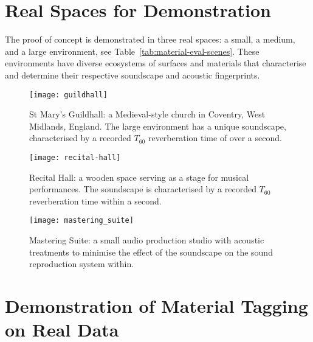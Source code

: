 \section{Real Spaces for Demonstration}
The proof of concept is demonstrated in three real spaces: a small, a medium, and a large environment, see Table~\ref{tab:material-eval-scenes}. These environments have diverse ecosystems of surfaces and materials that characterise and determine their respective soundscape and acoustic fingerprints.


\begin{figure}[htbp]
    \centering
    \texttt{[image: guildhall]}
    \caption[Proof of concept demonstration --- large environment]{St Mary's Guildhall: a Medieval-style church in Coventry, West Midlands, England. The large environment has a unique soundscape, characterised by a recorded $T_{60}$ reverberation time of over a second.}
    \label{fig:guildhall-iso-render}
\end{figure}

\begin{figure}[htbp]
    \centering
    \texttt{[image: recital-hall]}
    \caption[Proof of concept demonstration --- medium environment]{Recital Hall: a wooden space serving as a stage for musical performances. The soundscape is characterised by a recorded $T_{60}$ reverberation time within a second.}
    \label{fig:conservatoire-iso-render}
\end{figure}

\begin{figure}[htbp]
    \centering
    \texttt{[image: mastering\_suite]}
    \caption[Proof of concept demonstration --- small environment]{Mastering Suite: a small audio production studio with acoustic treatments to minimise the effect of the soundscape on the sound reproduction system within.}
    \label{fig:mastering-iso-render}
\end{figure}

\section{Demonstration of Material Tagging on Real Data}

